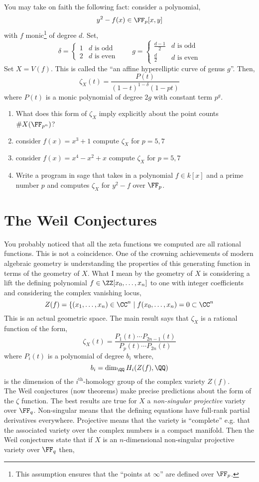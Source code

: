\documentclass[12pt]{article}
\begin{document}
You may take on faith the following fact: consider a polynomial,
\[ y^2 - f(x) \in \FF_p[x,y] \]
with $f$ monic\footnote{This assumption ensures that the ``points at $\infty$'' are defined over $\FF_p$.} of degree $d$. Set,
\[ \delta = 
\begin{cases}
1 & d \text{ is odd}
\\
2 & d \text{ is even}
\end{cases} 
\quad \quad
g = 
\begin{cases}
\frac{d-1}{2} & d \text{ is odd}
\\
\frac{d}{2} & d \text{ is even}
\end{cases} \]
Set $X = V(f)$. This is called the ``an affine hyperelliptic curve of genus $g$''. Then,
\[ \zeta_{X}(t) = \frac{P(t)}{(1 - t)^{1-\delta} (1 - p t)} \]
where $P(t)$ is a monic polynomial of degree $2g$ with constant term $p^g$. 
\begin{enumerate}
\item What does this form of $\zeta_{X}$ imply explicitly about the point counts $\# X(\FF_{p^n})$?
\item consider $f(x) = x^3 + 1$ compute $\zeta_X$ for $p = 5,7$
\item consider $f(x) = x^4 - x^2 + x$ compute $\zeta_X$ for $p = 5,7$
\item Write a program in sage that takes in a polynomial $f \in k[x]$ and a prime number $p$ and computes $\zeta_X$ for $y^2 - f$ over $\FF_p$.
\end{enumerate}


\section{The Weil Conjectures}

You probably noticed that all the zeta functions we computed are all rational functions. This is not a coincidence. One of the crowning achievements of modern algebraic geometry is understanding the properties of this generating function in terms of the geometry of $X$. What I mean by the geometry of $X$ is considering a lift the defining polynomial $f \in \ZZ[x_0, \dots, x_n]$ to one with integer coefficients and considering the complex vanishing locus,
\[ Z(f) = \{ (x_1, \dots, x_n) \in \CC^{n} \mid f(x_0, \dots, x_n) = 0 \subset \CC^{n} \]
This is an actual geometric space. The main result says that $\zeta_X$ is a rational function of the form,
\[ \zeta_X(t) = \frac{P_1(t) \cdots P_{2n-1}(t)}{P_p(t) \cdots P_{2n}(t)} \]
where $P_i(t)$ is a polynomial of degree $b_i$ where,
\[ b_i = \dim_{\QQ} H_i(Z(f), \QQ) \]
is the dimension of the $i^{\text{th}}$-homology group of the complex variety $Z(f)$.
\\
The Weil conjectures (now theorems) make precise predictions about the form of the $\zeta$ function. The best results are true for $X$ a \textit{non-singular projective} variety over $\FF_q$. Non-singular means that the defining equations have full-rank partial derivatives everywhere. Projective means that the variety is ``complete'' e.g. that the associated variety over the complex numbers is a compact manifold. Then the Weil conjectures state that if $X$ is an $n$-dimensional non-singular projective variety over $\FF_q$ then,
\end{document}
